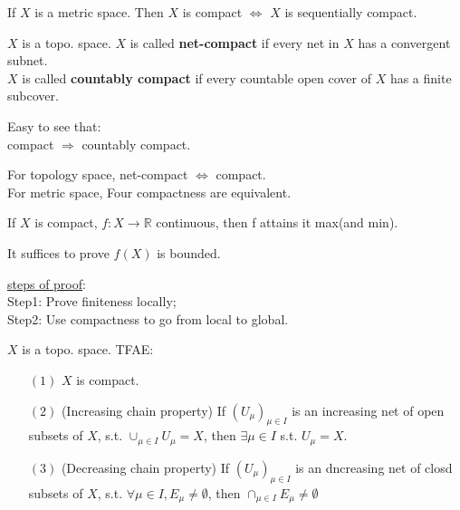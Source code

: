 \begin{theorem}
    If  $ X  $ is a metric space. Then  $  X  $ is compact
     $ \Leftrightarrow $  $ X  $ is sequentially compact.
\end{theorem}
\begin{definition}
     $ X $ is a topo. space.  $ X  $ is called \textbf{net-compact} if every net in  $ X  $ has a convergent subnet.\\
      $ X  $ is called \textbf{countably compact} if every countable open cover of  $ X  $ has a finite subcover. 
\end{definition}
Easy to see that:\\
compact $ \Rightarrow  $ countably compact.\\
\begin{proposition}
    For topology space, net-compact  $ \Leftrightarrow $ compact.\\
    For metric space, Four compactness are equivalent. 
\end{proposition}
\begin{example}
    If  $ X  $ is compact,  $ f:X\rightarrow \mathbb{R } $ continuous, then f attains it max(and min).
\end{example}
It suffices to prove  $ f(X ) $ is bounded.

\underline{steps of proof}:\\
Step1: Prove finiteness locally;\\
Step2: Use compactness to go from local to global.
\begin{proposition}
     $ X  $ is a topo. space. TFAE:
     \begin{enumerate}
        \item[$ (1) $]  $ X  $ is compact.
        \item[$ (2) $](Increasing chain property) If  $ (U_\mu)_{\mu\in I} $ is an increasing net of open subsets of  $ X  $, s.t.  $ \cup_{\mu\in I}U_\mu=X $, then  $ \exists \mu\in I  $ s.t.  $ U_\mu=X $.
        \item[$ (3) $](Decreasing chain property) If  $ (U_\mu)_{\mu\in I} $ is an dncreasing net of closd subsets of  $ X  $, s.t.  $ \forall \mu\in I,E_\mu\not=\emptyset  $, then  $ \cap_{\mu\in I }E_\mu\not=\emptyset $    
     \end{enumerate}
\end{proposition}